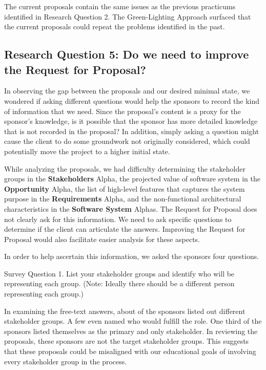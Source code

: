 The current proposals contain the same issues as the previous practicums identified in Research Question 2. The Green-Lighting Approach surfaced that the current proposals could repeat the problems identified in the past.


\subsection{Research Question 5: Do we need to
improve the Request for Proposal?}

In observing the gap between the proposals and our desired minimal
state, we wondered if asking different questions would help the sponsors
to record the kind of information that we need. Since the proposal's
content is a proxy for the sponsor's knowledge, is it possible that the
sponsor has more detailed knowledge that is not recorded in the proposal?
In addition, simply asking a question might cause the client to do some
groundwork not originally considered, which could potentially move the
project to a higher initial state. 

While analyzing the proposals, we had difficulty determining the stakeholder groups in the
 \textbf{Stakeholders} Alpha, the projected value of software system in the
 \textbf{Opportunity} Alpha, the list of high-level features that captures
the system purpose in the \textbf{Requirements} Alpha, and the non-functional
architectural characteristics in the \textbf{Software System} Alphas. The
Request for Proposal does not clearly ask for this information. We need
to ask specific questions to determine if the client can articulate the
answers. Improving the Request for Proposal would also facilitate
easier analysis for these aspects.

In order to help ascertain this information, we asked the sponsors four
questions.

{Survey Question 1. List your stakeholder groups and identify who will be
representing each group. (Note: Ideally there should be a different
person representing each group.)}

In examining the free-text answers, about  of the sponsors listed
out different stakeholder groups. A few even named who would fulfill the
role. One third of the sponsors listed themselves as the primary and
only stakeholder. In reviewing the proposals, these sponsors are not the
target stakeholder groups. This suggests that these proposals could be
misaligned with our educational goals of involving every stakeholder
group in the process.

